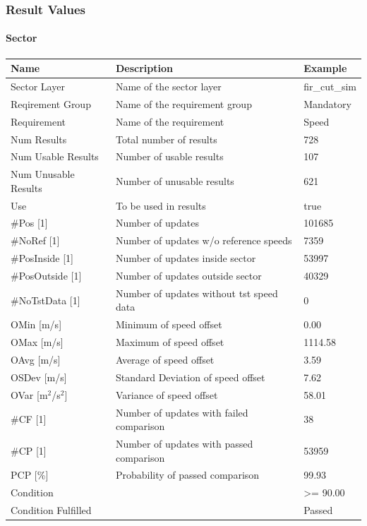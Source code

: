 \subsubsection{Result Values}

\paragraph{Sector}

\begin{center}
 \begin{table}[H]
  \begin{tabularx}{\textwidth}{ | l | X |  l | }
    \hline
    \textbf{Name} & \textbf{Description} & \textbf{Example} \\ \hline
    Sector Layer & Name of the sector layer & fir\_cut\_sim \\ \hline
    Reqirement Group & Name of the requirement group & Mandatory \\ \hline
    Requirement & Name of the requirement & Speed \\ \hline
    Num Results & Total number of results & 728 \\ \hline
    Num Usable Results & Number of usable results & 107 \\ \hline
    Num Unusable Results & Number of unusable results & 621 \\ \hline
    Use & To be used in results & true \\ \hline
    \#Pos [1] & Number of updates & 101685 \\ \hline
    \#NoRef [1] & Number of updates w/o reference speeds & 7359 \\ \hline
    \#PosInside [1] & Number of updates inside sector & 53997 \\ \hline
    \#PosOutside [1] & Number of updates outside sector & 40329 \\ \hline
    \#NoTstData [1] & Number of updates without tst speed data & 0 \\ \hline
    OMin [m/s] & Minimum of speed offset & 0.00 \\ \hline
    OMax [m/s] & Maximum of speed offset & 1114.58 \\ \hline
    OAvg [m/s] & Average of speed offset & 3.59 \\ \hline
    OSDev [m/s] & Standard Deviation of speed offset & 7.62 \\ \hline
    OVar [m$^2$/s$^2$] & Variance of speed offset & 58.01 \\ \hline
    \#CF [1] & Number of updates with failed comparison & 38 \\ \hline
    \#CP [1] & Number of updates with passed comparison  & 53959 \\ \hline
    PCP [\%] & Probability of passed comparison & 99.93 \\ \hline
    Condition &  & >= 90.00 \\ \hline
    Condition Fulfilled &  & Passed \\ \hline
\end{tabularx}
\end{table}
\end{center}

